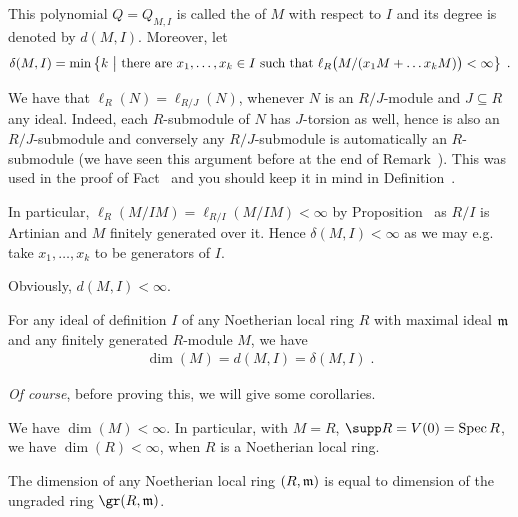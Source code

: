 \documentclass[a4paper,parskip=half,numbers=enddot, DIV=12]{scrreprt}
\begin{document}
\begin{defi}
    This polynomial $Q=Q_{M,I}$ is called the  of $M$ with respect to $I$ and its degree is denoted by $d(M,I)$. Moreover, let 
    \begin{align*}
        \delta(M,I) = \min\left\{k \ \middle|\  \text{there are }x_1,\ldots,x_k\in I \text{ such that } \ell_R\big(M/(x_1M+\ldots x_k M)\big)<\infty\right\}\;.
    \end{align*}
\end{defi}
\begin{rem*}
    \begin{alphanumerate}
    \item 
        We have that $\ell_R(N) = \ell_{R/J}(N)$, whenever $N$ is an $R/J$-module and $J\subseteq R$ any ideal. Indeed, each $R$-submodule of $N$ has $J$-torsion as well, hence is also an $R/J$-submodule and conversely any $R/J$-submodule is automatically an $R$-submodule (we have seen this argument before at the end of Remark~). This was used in the proof of Fact~ and you should keep it in mind in Definition~.
     \item   
         In particular, $\ell_R(M/IM)=\ell_{R/I}(M/IM) < \infty$ by Proposition~ as $R/I$ is Artinian and $M$ finitely generated over it. Hence $\delta(M,I) < \infty$ as we may e.g. take $x_1,\ldots, x_k$ to be generators of $I$.
    \item 
        Obviously, $d(M,I)<\infty$.
    \end{alphanumerate}
\end{rem*}
\begin{thm}
    For any ideal of definition $I$ of any Noetherian local ring $R$ with maximal ideal $\mathfrak{m}$ and any finitely generated $R$-module $M$, we have 
    \begin{align*}
    	\dim (M) = d(M,I) = \delta(M,I)\;.
    \end{align*}    
\end{thm}
\emph{Of course}, before proving this, we will give some corollaries.
\begin{cor}
    We have $\dim(M) <\infty$. In particular, with $M=R$, $\supp R= V(0) = \Spec R$, we have $\dim(R)<\infty$, when $R$ is a Noetherian local ring.
\end{cor}
\begin{cor}
    The dimension of any Noetherian local ring $(R,\mathfrak{m})$ is equal to dimension of the ungraded ring $\gr(R,\mm)$.
\end{cor}
\end{document}
